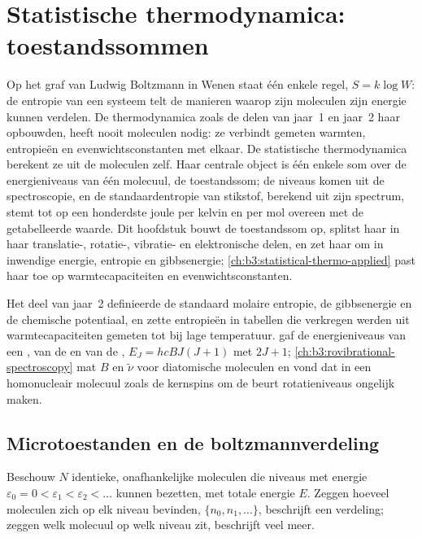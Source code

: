 \chapter{Statistische thermodynamica: toestandssommen}\label{ch:b3:partition-functions}

Op het graf van Ludwig Boltzmann in Wenen staat één enkele regel, $S = k\log W$: de
entropie van een systeem telt de manieren waarop zijn moleculen zijn
energie kunnen verdelen. De thermodynamica zoals de delen van jaar~1 en
jaar~2 haar opbouwden, heeft nooit moleculen nodig: ze verbindt gemeten
warmten, entropieën en evenwichtsconstanten met elkaar. De statistische
thermodynamica berekent ze uit de moleculen zelf. Haar centrale object is
één enkele som over de energieniveaus van één molecuul, de toestandssom;
de niveaus komen uit de spectroscopie, en de standaardentropie van
stikstof, berekend uit zijn spectrum, stemt tot op een honderdste joule per
kelvin en per mol overeen met de getabelleerde waarde. Dit hoofdstuk bouwt
de toestandssom op, splitst haar in haar translatie-, rotatie-, vibratie-
en elektronische delen, en zet haar om in inwendige energie, entropie en
gibbsenergie; \cref{ch:b3:statistical-thermo-applied} past haar toe op
warmtecapaciteiten en evenwichtsconstanten.

\begin{recall}
Het deel van jaar~2 definieerde de standaard molaire entropie, de
gibbsenergie en de chemische potentiaal, en zette entropieën in tabellen
die verkregen werden uit warmtecapaciteiten gemeten tot bij lage
temperatuur.  gaf de energieniveaus van
een , van de  en van de , $E_J = hcBJ(J+1)$ met  $2J + 1$;
\cref{ch:b3:rovibrational-spectroscopy} mat $B$ en $\tilde\nu$ voor
diatomische moleculen en vond dat in een homonucleair molecuul zoals
 de kernspins om de beurt rotatieniveaus ongelijk maken.
\end{recall}

\section{Microtoestanden en de boltzmannverdeling}

Beschouw $N$ identieke, onafhankelijke moleculen die niveaus met energie
$\varepsilon_0 = 0 < \varepsilon_1 < \varepsilon_2 < \dots$ kunnen bezetten, met totale energie $E$. Zeggen hoeveel
moleculen zich op elk niveau bevinden, $\{n_0, n_1, \dots\}$, beschrijft een
verdeling; zeggen welk molecuul op welk niveau zit, beschrijft veel meer.

